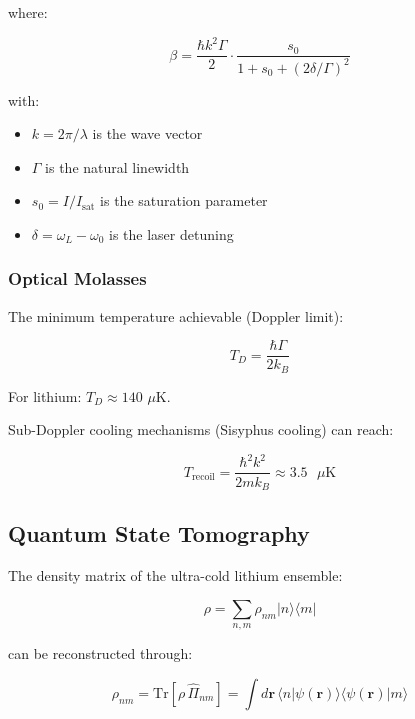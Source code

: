 where:

\begin{equation}
\label{eq:cooling_coefficient}
\beta = \frac{\hbar k^2 \Gamma}{2} \cdot \frac{s_0}{1 + s_0 + (2\delta/\Gamma)^2}
\end{equation}

with:
\begin{itemize}
    \item $k = 2\pi/\lambda$ is the wave vector
    \item $\Gamma$ is the natural linewidth
    \item $s_0 = I/I_{\text{sat}}$ is the saturation parameter
    \item $\delta = \omega_L - \omega_0$ is the laser detuning
\end{itemize}

\subsubsection{Optical Molasses}

The minimum temperature achievable (Doppler limit):

\begin{equation}
\label{eq:doppler_limit}
T_D = \frac{\hbar \Gamma}{2k_B}
\end{equation}

For lithium: $T_D \approx 140$ $\mu$K.

Sub-Doppler cooling mechanisms (Sisyphus cooling) can reach:

\begin{equation}
\label{eq:sisyphus_temperature}
T_{\text{recoil}} = \frac{\hbar^2 k^2}{2m k_B} \approx 3.5 \text{ $\mu$K}
\end{equation}

\subsection{Quantum State Tomography}

The density matrix of the ultra-cold lithium ensemble:

\begin{equation}
\label{eq:density_matrix}
\rho = \sum_{n,m} \rho_{nm} |n\rangle\langle m|
\end{equation}

can be reconstructed through:

\begin{equation}
\label{eq:tomography}
\rho_{nm} = \text{Tr}[\rho \, \hat{\Pi}_{nm}] = \int d\mathbf{r}\, \langle n|\psi(\mathbf{r})\rangle\langle\psi(\mathbf{r})|m\rangle
\end{equation}

